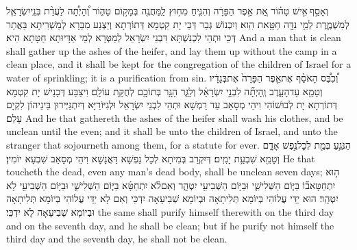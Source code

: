 {וְאָסַ֣ף \legarmeh  אִ֣ישׁ טָה֗וֹר אֵ֚ת אֵ֣פֶר הַפָּרָ֔ה וְהִנִּ֛יחַ מִח֥וּץ לַֽמַּחֲנֶ֖ה בְּמָק֣וֹם טָה֑וֹר וְ֠הָיְתָ֠ה לַעֲדַ֨ת בְּנֵֽי\maqqaf יִשְׂרָאֵ֧ל לְמִשְׁמֶ֛רֶת לְמֵ֥י נִדָּ֖ה חַטָּ֥את הִֽוא׃}
{וְיִכְנוֹשׁ גְּבַר דְּכֵי יָת קִטְמָא דְּתוֹרְתָא וְיַצְנַע מִבַּרָא לְמַשְׁרִיתָא בַּאֲתַר דְּכֵי וּתְהֵי לִכְנִשְׁתָּא דִּבְנֵי יִשְׂרָאֵל לְמַטְּרָא לְמֵי אַדָּיוּתָא חַטָּתָא הִיא׃}
{And a man that is clean shall gather up the ashes of the heifer, and lay them up without the camp in a clean place, and it shall be kept for the congregation of the children of Israel for a water of sprinkling; it is a purification from sin.}{}
{וְ֠כִבֶּ֠ס הָאֹסֵ֨ף אֶת\maqqaf אֵ֤פֶר הַפָּרָה֙ אֶת\maqqaf בְּגָדָ֔יו וְטָמֵ֖א עַד\maqqaf הָעָ֑רֶב וְֽהָיְתָ֞ה לִבְנֵ֣י יִשְׂרָאֵ֗ל וְלַגֵּ֛ר הַגָּ֥ר בְּתוֹכָ֖ם לְחֻקַּ֥ת עוֹלָֽם׃}
{וִיצַבַּע דְּכָנֵישׁ יָת קִטְמָא דְּתוֹרְתָא יָת לְבוּשׁוֹהִי וִיהֵי מְסָאַב עַד רַמְשָׁא וּתְהֵי לִבְנֵי יִשְׂרָאֵל וּלְגִיּוֹרַיָּא דְּיִתְגַּיְּירוּן בֵּינֵיהוֹן לִקְיָם עָלַם׃}
{And he that gathereth the ashes of the heifer shall wash his clothes, and be unclean until the even; and it shall be unto the children of Israel, and unto the stranger that sojourneth among them, for a statute for ever.}{}
{הַנֹּגֵ֥עַ בְּמֵ֖ת לְכׇל\maqqaf נֶ֣פֶשׁ אָדָ֑ם וְטָמֵ֖א שִׁבְעַ֥ת יָמִֽים׃}
{דְּיִקְרַב בְּמִיתָא לְכָל נַפְשָׁא דַּאֲנָשָׁא וִיהֵי מְסָאַב שִׁבְעָא יוֹמִין׃}
{He that toucheth the dead, even any man’s dead body, shall be unclean seven days;}{}
{ה֣וּא יִתְחַטָּא\maqqaf ב֞וֹ בַּיּ֧וֹם הַשְּׁלִישִׁ֛י וּבַיּ֥וֹם הַשְּׁבִיעִ֖י יִטְהָ֑ר וְאִם\maqqaf לֹ֨א יִתְחַטָּ֜א בַּיּ֧וֹם הַשְּׁלִישִׁ֛י וּבַיּ֥וֹם הַשְּׁבִיעִ֖י לֹ֥א יִטְהָֽר׃}
{הוּא יַדֵּי עֲלוֹהִי בְּיוֹמָא תְּלִיתָאָה וּבְיוֹמָא שְׁבִיעָאָה יִדְכֵּי וְאִם לָא יַדֵּי עֲלוֹהִי בְּיוֹמָא תְּלִיתָאָה וּבְיוֹמָא שְׁבִיעָאָה לָא יִדְכֵּי׃}
{the same shall purify himself therewith on the third day and on the seventh day, and he shall be clean; but if he purify not himself the third day and the seventh day, he shall not be clean.}{}
